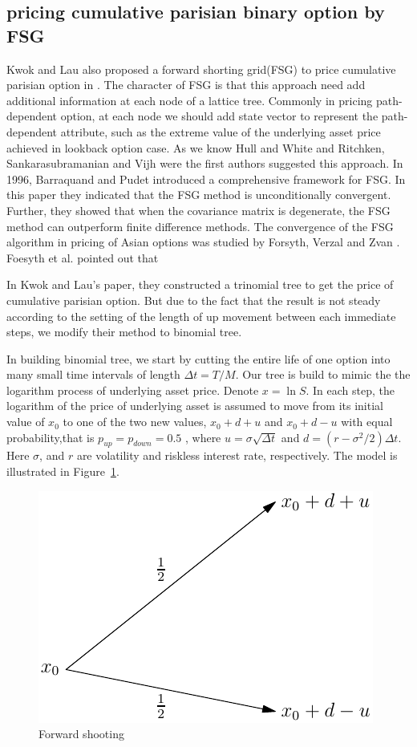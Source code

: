 \documentclass[11pt]{book}
\begin{document}
\subsection{pricing cumulative parisian binary option by FSG}
Kwok and Lau also proposed a forward shorting grid(FSG) to price cumulative parisian option in \cite{Kwok2001}. The character of FSG is that this approach need add additional information at each node of  a lattice tree. Commonly in pricing path-dependent option, at each node we should add state vector to represent the path-dependent attribute, such as the extreme value of the underlying asset price achieved in lookback option case. As we know Hull and White \cite{Hull1993} and Ritchken, Sankarasubramanian and Vijh \cite{Vijh1993} were the first authors suggested this approach. In 1996, Barraquand and Pudet \cite{Barraquand1996} introduced a comprehensive framework for FSG. In this paper they indicated that the FSG method is unconditionally convergent. Further, they showed that when the covariance matrix is degenerate, the FSG method can outperform finite difference methods. The convergence of the FSG algorithm in pricing of Asian options was studied by Forsyth, Verzal and Zvan \cite{Forsyth1999}. Foesyth et al. pointed out that    
 
 In Kwok and Lau's paper\cite{Kwok2001}, they constructed a trinomial tree to get the price of cumulative parisian option. But due to the fact that the result is not steady according to the setting of the length of up movement between each immediate steps, we modify their method to binomial tree. 
 
In building binomial tree, we start by cutting the entire life of one option into many small time intervals of length $\Delta t = T / M$. 
Our tree is build to mimic the the logarithm process of underlying asset price. Denote $x=\ln S$. In each step, the logarithm of the price of underlying asset is assumed to move from its initial value of $x_0$ to one of the two new values, $x_0 + d + u$ and $x_0 + d - u$ with equal probability,that is $p_{up} = p_{down} = 0.5$ , where $u = \sigma \sqrt{\Delta t}$ and $d = (r - {\sigma}^2 /2)\Delta t$. Here $\sigma$, and $r$ are volatility and riskless interest rate, respectively. The model is illustrated in Figure~\ref{fig:tree1}.  
\begin{figure}[htbp]
   \centering
   \includegraphics{trees.pdf} %
   \caption{Forward shooting}
   \label{fig:tree1}
\end{figure}
\end{document}
